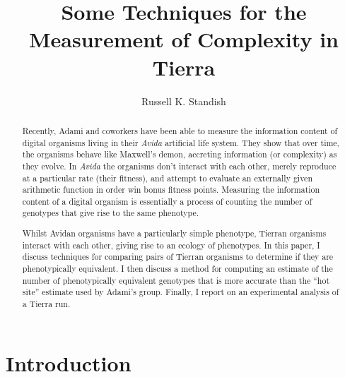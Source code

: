 \title{Some Techniques for the Measurement of Complexity in Tierra}
\author{Russell K. Standish}


\maketitle

\begin{abstract}
Recently, Adami and coworkers have been able to measure the
information content of digital organisms living in their {\em Avida}
artificial life system. They show that over time, the organisms behave
like Maxwell's demon, accreting information (or complexity) as they
evolve. In {\em Avida} the organisms don't interact with each other,
merely reproduce at a particular rate (their fitness), and attempt to
evaluate an externally given arithmetic function in order win bonus
fitness points. Measuring the information content of a digital
organism is essentially a process of counting the number of genotypes
that give rise to the same phenotype.

Whilst Avidan organisms have a particularly simple phenotype, Tierran
organisms interact with each other, giving rise to an ecology of
phenotypes. In this paper, I discuss techniques for comparing pairs of
Tierran organisms to determine if they are phenotypically
equivalent. I then discuss a method for computing an estimate of the
number of phenotypically equivalent genotypes that is more accurate
than the ``hot site'' estimate used by Adami's group. Finally, I
report on an experimental analysis of a Tierra run.
\end{abstract}

\section{Introduction}

